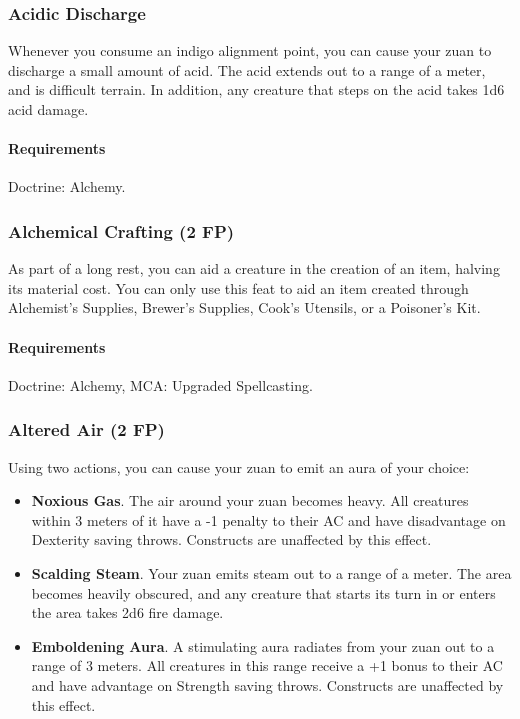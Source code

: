 \subsubsection{Acidic Discharge} \label{feat::acidicdischarge}
    Whenever you consume an indigo alignment point, you can cause your zuan to discharge a small amount of acid.
    The acid extends out to a range of a meter, and is difficult terrain.
    In addition, any creature that steps on the acid takes 1d6 acid damage.
    \paragraph{Requirements} Doctrine: Alchemy.
\subsubsection{Alchemical Crafting (2 FP)} \label{feat::alchemicalcrafting}
    As part of a long rest, you can aid a creature in the creation of an item, halving its material cost.
    You can only use this feat to aid an item created through Alchemist's Supplies, Brewer's Supplies, Cook's Utensils, or a Poisoner's Kit.
    \paragraph{Requirements} Doctrine: Alchemy, MCA: Upgraded Spellcasting.
\subsubsection{Altered Air (2 FP)} \label{feat::alteredair}
    Using two actions, you can cause your zuan to emit an aura of your choice:
    \begin{itemize}
        \item \textbf{Noxious Gas}.
        The air around your zuan becomes heavy.
        All creatures within 3 meters of it have a -1 penalty to their AC and have disadvantage on Dexterity saving throws.
        Constructs are unaffected by this effect.
        \item \textbf{Scalding Steam}.
        Your zuan emits steam out to a range of a meter.
        The area becomes heavily obscured, and any creature that starts its turn in or enters the area takes 2d6 fire damage.
        \item \textbf{Emboldening Aura}.
        A stimulating aura radiates from your zuan out to a range of 3 meters.
        All creatures in this range receive a +1 bonus to their AC and have advantage on Strength saving throws.
        Constructs are unaffected by this effect.
    \end{itemize}

